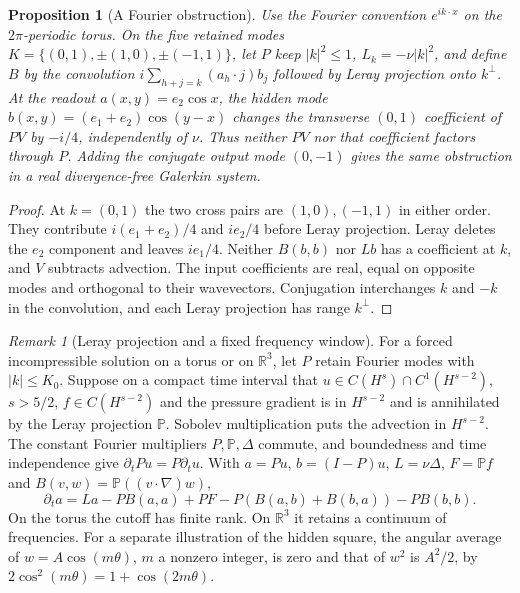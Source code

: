 \documentclass[aps,pra,onecolumn,superscriptaddress,nofootinbib,10pt]{revtex4-2}
\newtheorem{proposition}[theorem]{Proposition}
\theoremstyle{definition}
\theoremstyle{remark}
\newtheorem{remark}[theorem]{Remark}
\begin{document}
\begin{proposition}[A Fourier obstruction]
\label{ob:fluidfive}
Use the Fourier convention $e^{ik\cdot x}$ on the $2\pi$-periodic torus.
On the five retained modes
$K=\{(0,1),\pm(1,0),\pm(-1,1)\}$, let $P$ keep $|k|^2\le1$,
$L_k=-\nu |k|^2$, and define $B$ by the convolution
$i\sum_{h+j=k}(a_h\cdot j)b_j$ followed by Leray projection onto $k^\perp$.
At the readout $a(x,y)=e_2\cos x$, the hidden mode
$b(x,y)=(e_1+e_2)\cos(y-x)$ changes the transverse $(0,1)$ coefficient
of $PV$ by $-i/4$, independently of $\nu$. Thus neither $PV$ nor that
coefficient factors through $P$. Adding the conjugate output mode
$(0,-1)$ gives the same obstruction in a real divergence-free Galerkin
system.
\end{proposition}
\begin{proof}
At $k=(0,1)$ the two cross pairs are $(1,0),(-1,1)$ in either order.
They contribute $i(e_1+e_2)/4$ and $ie_2/4$ before Leray projection.
Leray deletes the $e_2$ component and leaves $ie_1/4$. Neither
$B(b,b)$ nor $Lb$ has a coefficient at $k$, and $V$ subtracts advection.
The input coefficients are real, equal on opposite modes and orthogonal
to their wavevectors. Conjugation interchanges $k$ and $-k$ in the
convolution, and each Leray projection has range $k^\perp$.
\end{proof}

\begin{remark}[Leray projection and a fixed frequency window]
\label{ob:leraywindow}
For a forced incompressible solution on a torus or on $\mathbb R^3$,
let $P$ retain Fourier modes with $|k|\le K_0$. Suppose on a compact
time interval that $u\in C(H^s)\cap C^1(H^{s-2})$, $s>5/2$,
$f\in C(H^{s-2})$ and the pressure gradient is in $H^{s-2}$ and is
annihilated by the Leray projection $\mathbb P$. Sobolev multiplication
puts the advection in $H^{s-2}$. The constant Fourier multipliers
$P,\mathbb P,\Delta$ commute, and boundedness and time independence give
$\partial_tPu=P\partial_tu$. With $a=Pu$, $b=(I-P)u$, $L=\nu\Delta$,
$F=\mathbb P f$ and $B(v,w)=\mathbb P((v\cdot\nabla)w)$,
\[
 \partial_ta=La-PB(a,a)+PF-P(B(a,b)+B(b,a))-PB(b,b).
\]
On the torus the cutoff has finite rank. On $\mathbb R^3$ it retains a
continuum of frequencies. For a separate illustration of the hidden square,
the angular average of $w=A\cos(m\theta)$, $m$ a nonzero integer, is zero
and that of $w^2$ is $A^2/2$, by $2\cos^2(m\theta)=1+\cos(2m\theta)$.
\end{remark}
\end{document}
